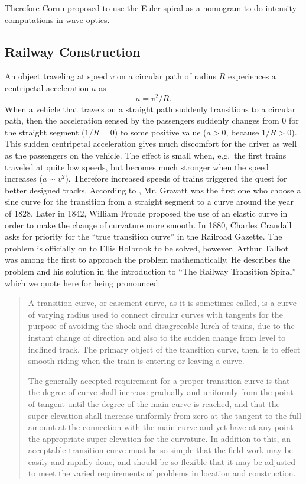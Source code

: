 \documentclass[12pt]{article}
\begin{document}
Therefore Cornu proposed to use the Euler spiral as a nomogram to do intensity computations in wave optics.

\FloatBarrier 
\subsection{Railway  Construction}
An object traveling at speed $v$ on a circular path of radius $R$ experiences a centripetal acceleration $a$ as
$$  a = v^2/R.
$$ When a vehicle that travels on a straight path suddenly transitions to a circular path, then the acceleration sensed by the passengers suddenly changes from $0$ for the straight segment ($1/R=0$) to some positive value ($a>0$, because $1/R>0$). This sudden centripetal acceleration gives much discomfort for the driver as well as the passengers on the vehicle.  The effect is small when, e.g.~the first trains traveled at quite low speeds, but becomes much stronger when the speed increases ($a\sim v^2$).  Therefore increased speeds of trains triggered the quest for better designed tracks.  According to \cite{Lev08}, Mr. Gravatt was the first one who choose a sine curve for the transition from a straight segment to a curve around the year of 1828. Later in 1842, William Froude proposed the use of an elastic curve in order to make the change of curvature more smooth. In 1880, Charles Crandall asks for priority for the ``true transition curve'' in the Railroad Gazette.  The problem is officially on to Ellis Holbrook to be solved, however, Arthur Talbot was among the first to approach the problem mathematically.  He describes the problem and his solution in the introduction to ``The Railway Transition Spiral'' \cite{Tal99} which we quote here for being pronounced:

\begin{quotation}
	A transition curve, or easement curve, as it is sometimes called, is a curve of varying radius used to connect circular curves with tangents for the purpose of avoiding the shock and disagreeable lurch of trains, due to the instant change of direction and also to the sudden change from level to inclined track. The primary object of the transition curve, then, is to effect smooth riding when the train is entering or leaving a curve.

	The generally accepted requirement for a proper transition curve is that the degree-of-curve shall increase gradually and uniformly from the point of tangent until the degree of the main curve is reached, and that the super-elevation shall increase uniformly from zero at the tangent to the full amount at the connection with the main curve and yet have at any point
	the appropriate super-elevation for the curvature. In addition to this, an acceptable transition curve must be so simple that the field work may be easily and rapidly done, and should be so flexible that it may be adjusted to meet the varied requirements of problems in location and construction.
\end{quotation}
\end{document}
